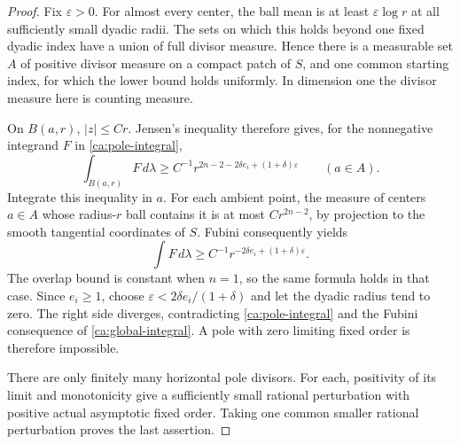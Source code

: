 \begin{proof}
Fix \(\varepsilon>0\).  For almost every center, the ball mean
is at least \(\varepsilon\log r\) at all sufficiently small
dyadic radii.  The sets on which this holds beyond one fixed
dyadic index have a union of full divisor measure.
Hence there is a measurable set \(A\) of positive divisor measure
on a compact patch of \(S\), and one common starting index, for
which the lower bound holds uniformly.  In dimension one the
divisor measure here is counting measure.

On \(B(a,r)\), \(|z|\leq Cr\).  Jensen's inequality therefore
gives, for the nonnegative integrand \(F\) in
\eqref{ca:pole-integral},
\[
 \int_{B(a,r)}F\,d\lambda
 \geq C^{-1}r^{2n-2-2\delta e_i+(1+\delta)\varepsilon}
 \qquad(a\in A).
\]
Integrate this inequality in \(a\).  For each ambient point, the
measure of centers \(a\in A\) whose radius-\(r\) ball contains
it is at most \(Cr^{2n-2}\), by projection to the smooth
tangential coordinates of \(S\).  Fubini consequently yields
\[
 \int F\,d\lambda
 \geq C^{-1}r^{-2\delta e_i+(1+\delta)\varepsilon}.
\]
The overlap bound is constant when \(n=1\), so the same formula
holds in that case.  Since \(e_i\geq1\), choose
\(\varepsilon<2\delta e_i/(1+\delta)\) and let the dyadic
radius tend to zero.  The right side diverges, contradicting
\eqref{ca:pole-integral} and the Fubini consequence of
\eqref{ca:global-integral}.  A pole with zero limiting fixed order
is therefore impossible.

There are only finitely many horizontal pole divisors.  For each,
positivity of its limit and monotonicity give a sufficiently small
rational perturbation with positive actual asymptotic fixed order.
Taking one common smaller rational perturbation proves the last
assertion.
\end{proof}
